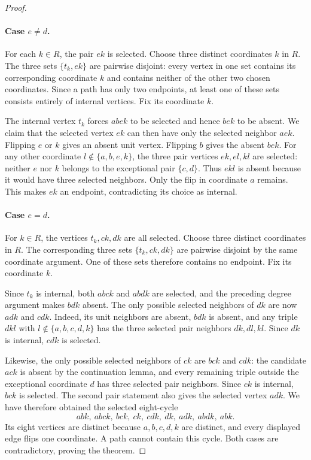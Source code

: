 \documentclass[11pt,a4paper]{article}
\theoremstyle{definition}
\theoremstyle{remark}
\begin{document}
\begin{proof}
\paragraph{Case $e\ne d$.}
For each $k\in R$, the pair $ek$ is selected. Choose three distinct coordinates $k$ in $R$. The three sets $\{t_k,ek\}$ are pairwise disjoint: every vertex in one set contains its corresponding coordinate $k$ and contains neither of the other two chosen coordinates. Since a path has only two endpoints, at least one of these sets consists entirely of internal vertices. Fix its coordinate $k$.

The internal vertex $t_k$ forces $abek$ to be selected and hence $bek$ to be absent. We claim that the selected vertex $ek$ can then have only the selected neighbor $aek$. Flipping $e$ or $k$ gives an absent unit vertex. Flipping $b$ gives the absent $bek$. For any other coordinate $l\notin\{a,b,e,k\}$, the three pair vertices $ek,el,kl$ are selected: neither $e$ nor $k$ belongs to the exceptional pair $\{c,d\}$. Thus $ekl$ is absent because it would have three selected neighbors. Only the flip in coordinate $a$ remains. This makes $ek$ an endpoint, contradicting its choice as internal.

\paragraph{Case $e=d$.}
For $k\in R$, the vertices $t_k,ck,dk$ are all selected. Choose three distinct coordinates in $R$. The corresponding three sets $\{t_k,ck,dk\}$ are pairwise disjoint by the same coordinate argument. One of these sets therefore contains no endpoint. Fix its coordinate $k$.

Since $t_k$ is internal, both $abck$ and $abdk$ are selected, and the preceding degree argument makes $bdk$ absent. The only possible selected neighbors of $dk$ are now $adk$ and $cdk$. Indeed, its unit neighbors are absent, $bdk$ is absent, and any triple $dkl$ with $l\notin\{a,b,c,d,k\}$ has the three selected pair neighbors $dk,dl,kl$. Since $dk$ is internal, $cdk$ is selected.

Likewise, the only possible selected neighbors of $ck$ are $bck$ and $cdk$: the candidate $ack$ is absent by the continuation lemma, and every remaining triple outside the exceptional coordinate $d$ has three selected pair neighbors. Since $ck$ is internal, $bck$ is selected. The second pair statement also gives the selected vertex $adk$. We have therefore obtained the selected eight-cycle
\[
abk,\ abck,\ bck,\ ck,\ cdk,\ dk,\ adk,\ abdk,\ abk.
\]
Its eight vertices are distinct because $a,b,c,d,k$ are distinct, and every displayed edge flips one coordinate. A path cannot contain this cycle. Both cases are contradictory, proving the theorem.
\end{proof}
\end{document}
